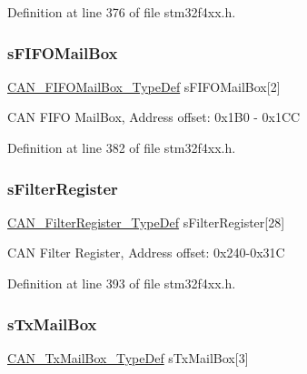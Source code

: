 Definition at line 376 of file stm32f4xx.\+h.

\mbox{\label{struct_c_a_n___type_def_a21b030b34e131f7ef6ea273416449fe4}} 
\subsubsection{\texorpdfstring{s\+F\+I\+F\+O\+Mail\+Box}{sFIFOMailBox}}
{\footnotesize\ttfamily \hyperlink{struct_c_a_n___f_i_f_o_mail_box___type_def}{C\+A\+N\+\_\+\+F\+I\+F\+O\+Mail\+Box\+\_\+\+Type\+Def} s\+F\+I\+F\+O\+Mail\+Box\mbox{[}2\mbox{]}}

C\+AN F\+I\+FO Mail\+Box, Address offset\+: 0x1\+B0 -\/ 0x1\+CC 

Definition at line 382 of file stm32f4xx.\+h.

\mbox{\label{struct_c_a_n___type_def_a31bd74513e6e599319702ad34113bf59}} 
\subsubsection{\texorpdfstring{s\+Filter\+Register}{sFilterRegister}}
{\footnotesize\ttfamily \hyperlink{struct_c_a_n___filter_register___type_def}{C\+A\+N\+\_\+\+Filter\+Register\+\_\+\+Type\+Def} s\+Filter\+Register\mbox{[}28\mbox{]}}

C\+AN Filter Register, Address offset\+: 0x240-\/0x31C 

Definition at line 393 of file stm32f4xx.\+h.

\mbox{\label{struct_c_a_n___type_def_ae37503ab1a7bbd29846f94cdadf0a9ef}} 
\subsubsection{\texorpdfstring{s\+Tx\+Mail\+Box}{sTxMailBox}}
{\footnotesize\ttfamily \hyperlink{struct_c_a_n___tx_mail_box___type_def}{C\+A\+N\+\_\+\+Tx\+Mail\+Box\+\_\+\+Type\+Def} s\+Tx\+Mail\+Box\mbox{[}3\mbox{]}}


